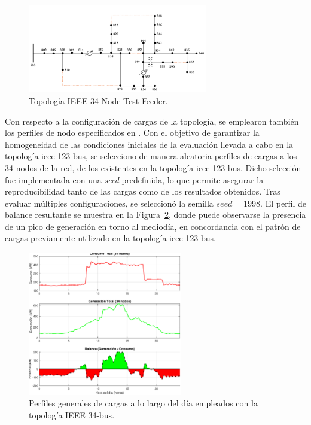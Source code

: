 \begin{figure}[ht!]
    \centering
    \includegraphics[width=0.7\textwidth]{fig/07_bloste/bloste_16.png}
    \caption{Topología IEEE 34-Node Test Feeder.}
    \label{fig:ieee34}
\end{figure}

Con respecto a la configuración de cargas de la topología, se emplearon también los perfiles de nodo especificados en \cite{Schneider17}. Con el objetivo de garantizar la homogeneidad de las condiciones iniciales de la evaluación llevada a cabo en la topología \gls{ieee} 123-bus, se selecciono de manera aleatoria perfiles de cargas a los 34 nodos de la red, de los existentes en la topología \gls{ieee} 123-bus. Dicho selección fue implementada con una \textit{seed} predefinida, lo que permite asegurar la reproducibilidad tanto de las cargas como de los resultados obtenidos. Tras evaluar múltiples configuraciones, se seleccionó la semilla $seed = 1998$. El perfil de balance resultante se muestra en la Figura~\ref{fig:ieee34_loads}, donde puede observarse la presencia de un pico de generación en torno al mediodía, en concordancia con el patrón de cargas previamente utilizado en la topología \gls{ieee} 123-bus.


\begin{figure}[ht!]
    \centering
    \includegraphics[width=0.6\textwidth]{fig/07_bloste/bloste_17.pdf}
    \caption{Perfiles generales de cargas a lo largo del día empleados con la topología IEEE 34-bus.}
    \label{fig:ieee34_loads}
\end{figure}

